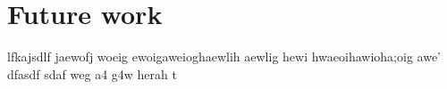 \chapter{Future work}
lfkajsdlf jaewofj woeig ewoigaweioghaewlih aewlig hewi hwaeoihawioha;oig awe' dfasdf sdaf weg a4 g4w herah t